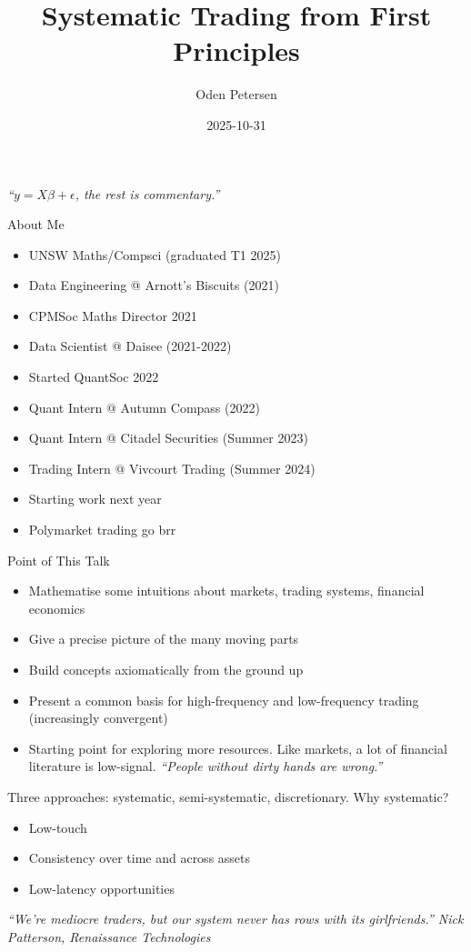 \documentclass{beamer}
\title[\texttt{/trading-presentation}]{Systematic Trading from First Principles}
\author[\texttt{github.com/odenpetersen}]{Oden Petersen}
\date{2025-10-31}
\begin{document}
\begin{frame}
	\titlepage
	\begin{center}
		\textit{``$y=X\beta+\epsilon$, the rest is commentary.''}
	\end{center}
\end{frame}

\begin{frame}{About Me}
	\begin{itemize}
		\item UNSW Maths/Compsci (graduated T1 2025)
		\item Data Engineering @ Arnott's Biscuits (2021)
		\item CPMSoc Maths Director 2021
		\item Data Scientist @ Daisee (2021-2022)
		\item Started QuantSoc 2022
		\item Quant Intern @ Autumn Compass (2022)
		\item Quant Intern @ Citadel Securities (Summer 2023)
		\item Trading Intern @ Vivcourt Trading (Summer 2024)
		\item Starting work next year
		\item Polymarket trading go brr
	\end{itemize}
\end{frame}

\begin{frame}{Point of This Talk}
	\begin{itemize}
		\item Mathematise some intuitions about markets, trading systems, financial economics
		\item Give a precise picture of the many moving parts
		\item Build concepts axiomatically from the ground up
		\item Present a common basis for high-frequency and low-frequency trading (increasingly convergent)
		\item Starting point for exploring more resources. Like markets, a lot of financial literature is low-signal. \textit{``People without dirty hands are wrong.''}
	\end{itemize}

	Three approaches: systematic, semi-systematic, discretionary. Why systematic?
	\begin{itemize}
		\item Low-touch
		\item Consistency over time and across assets
		\item Low-latency opportunities
	\end{itemize}
	\textit{``We’re mediocre traders, but our system never has rows with its girlfriends.'' Nick Patterson, Renaissance Technologies}
\end{frame}
\end{document}
